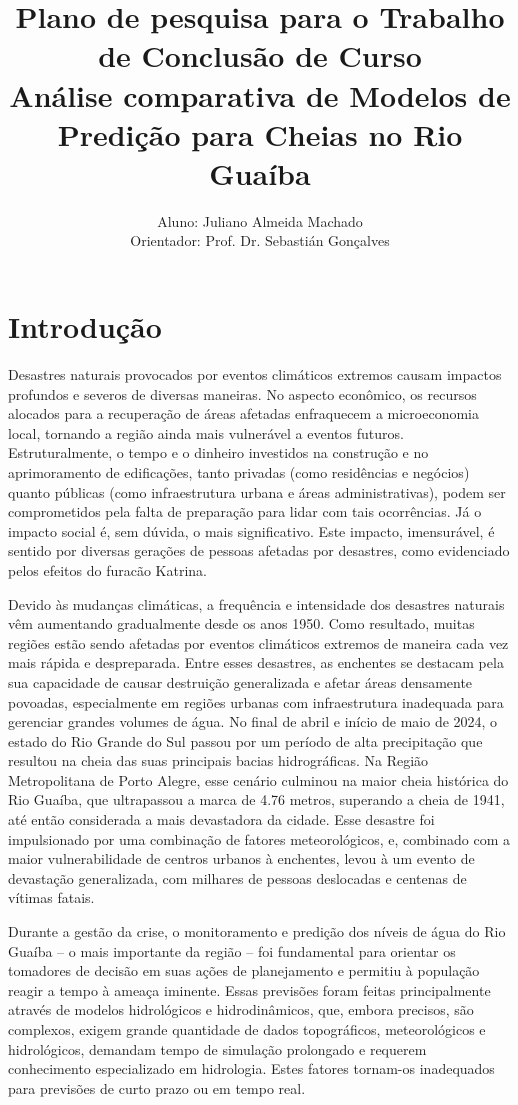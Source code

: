 \documentclass[
	12pt,				%
	openright,			%
	a4paper,			%
	english,			%
	french,				%
	spanish,			%
	brazil				%
	]{article}
\title{Plano de pesquisa para o Trabalho de Conclusão de Curso\\\large Análise comparativa de Modelos de Predição para Cheias no Rio Guaíba}
\author{Aluno: Juliano Almeida Machado \\
Orientador: Prof. Dr. Sebastián Gonçalves}
\date{}
\begin{document}
\maketitle

\section{Introdução}
Desastres naturais provocados por eventos climáticos extremos causam impactos profundos e severos de diversas maneiras. No aspecto econômico, os recursos alocados para a recuperação de áreas afetadas enfraquecem a microeconomia local, tornando a região ainda mais vulnerável a eventos futuros. Estruturalmente, o tempo e o dinheiro investidos na construção e no aprimoramento de edificações, tanto privadas (como residências e negócios) quanto públicas (como infraestrutura urbana e áreas administrativas), podem ser comprometidos pela falta de preparação para lidar com tais ocorrências. Já o impacto social é, sem dúvida, o mais significativo. Este impacto, imensurável, é sentido por diversas gerações de pessoas afetadas por desastres, como evidenciado pelos efeitos do furacão Katrina\cite{reardon}\cite{neria}.

Devido às mudanças climáticas, a frequência e intensidade dos desastres naturais vêm aumentando gradualmente desde os anos 1950\cite{dunn}. Como resultado, muitas regiões estão sendo afetadas por eventos climáticos extremos de maneira cada vez mais rápida e despreparada. Entre esses desastres, as enchentes se destacam pela sua capacidade de causar destruição generalizada e afetar áreas densamente povoadas, especialmente em regiões urbanas com infraestrutura inadequada para gerenciar grandes volumes de água. No final de abril e início de maio de 2024, o estado do Rio Grande do Sul passou por um período de alta precipitação que resultou na cheia das suas principais bacias hidrográficas. Na Região Metropolitana de Porto Alegre, esse cenário culminou na maior cheia histórica do Rio Guaíba, que ultrapassou a marca de 4.76 metros, superando a cheia de 1941, até então considerada a mais devastadora da cidade\cite{dep}. Esse desastre foi impulsionado por uma combinação de fatores meteorológicos, e, combinado com a maior vulnerabilidade de centros urbanos à enchentes\cite{yang}\cite{hammond}\cite{zhang}\cite{pereira}, levou à um evento de devastação generalizada, com milhares de pessoas deslocadas e centenas de vítimas fatais\cite{alcantara}. 

Durante a gestão da crise, o monitoramento e predição dos níveis de água do Rio Guaíba – o mais importante da região – foi fundamental para orientar os tomadores de decisão em suas ações de planejamento e permitiu à população reagir a tempo à ameaça iminente. Essas previsões foram feitas principalmente através de modelos hidrológicos e hidrodinâmicos\cite{iph}, que, embora precisos, são complexos, exigem grande quantidade de dados topográficos, meteorológicos e hidrológicos, demandam tempo de simulação prolongado e requerem conhecimento especializado em hidrologia. Estes fatores tornam-os inadequados para previsões de curto prazo ou em tempo real\cite{atashi}. 
\end{document}
